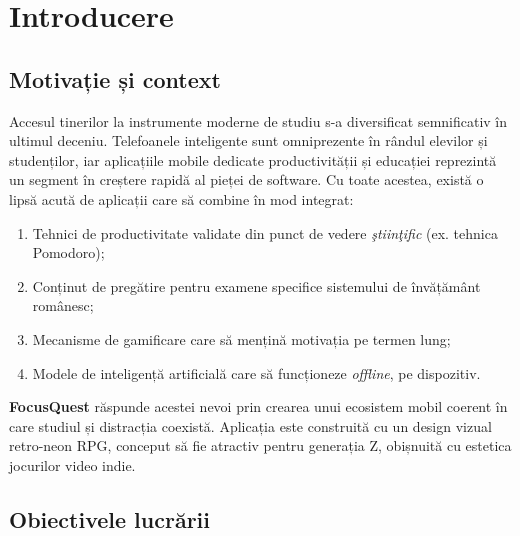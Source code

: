 \documentclass[12pt, a4paper, twoside]{report}
\numberwithin{equation}{section}
\begin{document}
\newpage

\tableofcontents
\newpage

\listoftables
{}
\listoffigures
{}

\chapter{Introducere}

\section{Motivație și context}

Accesul tinerilor la instrumente moderne de studiu s-a diversificat semnificativ în ultimul
deceniu. Telefoanele inteligente sunt omniprezente în rândul elevilor și studenților, iar
aplicațiile mobile dedicate productivității și educației reprezintă un segment în creștere
rapidă al pieței de software. Cu toate acestea, există o lipsă acută de aplicații care să
combine în mod integrat:
\begin{enumerate}
  \item Tehnici de productivitate validate din punct de vedere \textit{\c{s}tiin\c{t}ific} (ex. tehnica Pomodoro);
  \item Conținut de pregătire pentru examene specifice sistemului de învățământ românesc;
  \item Mecanisme de gamificare care să mențină motivația pe termen lung;
  \item Modele de inteligență artificială care să funcționeze \textit{offline}, pe dispozitiv.
\end{enumerate}

\textbf{FocusQuest} răspunde acestei nevoi prin crearea unui ecosistem mobil coerent în care
studiul și distracția coexistă. Aplicația este construită cu un design vizual retro-neon RPG,
conceput să fie atractiv pentru generația Z, obișnuită cu estetica jocurilor video indie.

\section{Obiectivele lucrării}
\end{document}
